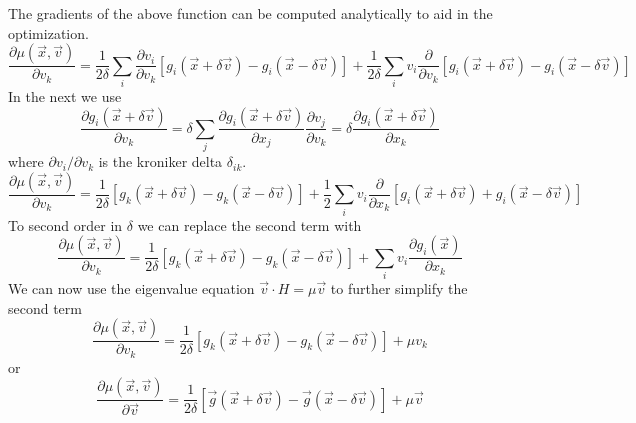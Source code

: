 \documentclass[a4paper]{article}
\begin{document}
The gradients of the above function can be computed analytically to aid in the optimization.
\begin{equation}
\frac{\partial \mu(\vec{x}, \vec{v})} {\partial v_k} = 
\frac{1}{2 \delta} 
\sum_i \frac{\partial v_i}{\partial v_k}
\left[ g_i(\vec{x} + \delta \vec{v}) 
- g_i(\vec{x} - \delta \vec{v}) \right]
+
\frac{1}{2 \delta} 
\sum_i v_i
\frac{\partial}{\partial v_k}
\left[ g_i(\vec{x} + \delta \vec{v}) 
- g_i(\vec{x} - \delta \vec{v}) \right]
\end{equation}
In the next we use
\begin{equation}
\frac{\partial g_i(\vec{x} + \delta \vec{v})}{ \partial v_k} 
= 
\delta \sum_j
\frac{\partial g_i(\vec{x} + \delta \vec{v})}{ \partial x_j}
\frac{\partial  v_j} { \partial v_k}
= \delta 
\frac{\partial g_i(\vec{x} + \delta \vec{v})}{ \partial x_k} 
\end{equation}
where $\partial v_i / \partial v_k$ is the kroniker delta $\delta_{ik}$.
\begin{equation}
\frac{\partial \mu(\vec{x}, \vec{v})} {\partial v_k} = 
\frac{1}{2 \delta} 
\left[ g_k(\vec{x} + \delta \vec{v}) 
- g_k(\vec{x} - \delta \vec{v}) \right]
+
\frac{1}{2} 
\sum_i v_i
\frac{\partial}{\partial x_k}
\left[ g_i(\vec{x} + \delta \vec{v}) 
+ g_i(\vec{x} - \delta \vec{v}) \right]
\end{equation}
To second order in $\delta$ we can replace the second term with
\begin{equation}
\frac{\partial \mu(\vec{x}, \vec{v})} {\partial v_k} = 
\frac{1}{2 \delta} 
\left[ g_k(\vec{x} + \delta \vec{v}) 
- g_k(\vec{x} - \delta \vec{v}) \right]
+
\sum_i v_i
\frac{\partial g_i(\vec{x})}{\partial x_k}
\end{equation}
We can now use the eigenvalue equation $\vec{v} \cdot H = \mu \vec{v}$ to further simplify the second term
\begin{equation}
\frac{\partial \mu(\vec{x}, \vec{v})} {\partial v_k} = 
\frac{1}{2 \delta} 
\left[ g_k(\vec{x} + \delta \vec{v}) 
- g_k(\vec{x} - \delta \vec{v}) \right]
+
\mu v_k
\end{equation}
or
\begin{equation}
\frac{\partial \mu(\vec{x}, \vec{v})} {\partial \vec{v}} = 
\frac{1}{2 \delta} 
\left[ \vec{g}(\vec{x} + \delta \vec{v}) 
- \vec{g}(\vec{x} - \delta \vec{v}) \right]
+
\mu \vec{v}
\end{equation}
\end{document}

